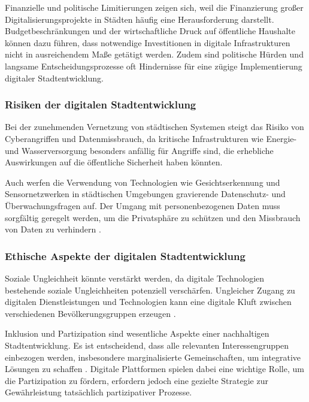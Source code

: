 \documentclass[conference,compsoc,final,a4paper, onecolumn, 11pt]{IEEEtran}
\begin{document}
Finanzielle und politische Limitierungen zeigen sich, weil die Finanzierung großer Digitalisierungsprojekte in Städten häufig eine Herausforderung darstellt. 
Budgetbeschränkungen und der wirtschaftliche Druck auf öffentliche Haushalte können dazu führen, dass notwendige Investitionen in digitale Infrastrukturen nicht in ausreichendem Maße getätigt werden. \autocite{hamilton_funding_2017} 
Zudem sind politische Hürden und langsame Entscheidungsprozesse oft Hindernisse für eine zügige Implementierung digitaler Stadtentwicklung.

\subsubsection{Risiken der digitalen Stadtentwicklung}
Bei der zunehmenden Vernetzung von städtischen Systemen steigt das Risiko von Cyberangriffen und Datenmissbrauch, da kritische Infrastrukturen wie Energie- und Wasserversorgung besonders anfällig für Angriffe sind, die erhebliche Auswirkungen auf die öffentliche Sicherheit haben könnten. \autocite{anwar_smart_2022}

Auch werfen die Verwendung von Technologien wie Gesichtserkennung und Sensornetzwerken in städtischen Umgebungen gravierende Datenschutz- und Überwachungsfragen auf. 
Der Umgang mit personenbezogenen Daten muss sorgfältig geregelt werden, um die Privatsphäre zu schützen und den Missbrauch von Daten zu verhindern \autocite{hongladarom_shoshana_2023}.

\subsubsection{Ethische Aspekte der digitalen Stadtentwicklung}
Soziale Ungleichheit könnte verstärkt werden, da digitale Technologien bestehende soziale Ungleichheiten potenziell verschärfen. 
Ungleicher Zugang zu digitalen Dienstleistungen und Technologien kann eine digitale Kluft zwischen verschiedenen Bevölkerungsgruppen erzeugen \autocite{helsper_corresponding_2012}.

Inklusion und Partizipation sind wesentliche Aspekte einer nachhaltigen Stadtentwicklung. 
Es ist entscheidend, dass alle relevanten Interessengruppen einbezogen werden, insbesondere marginalisierte Gemeinschaften, um integrative Lösungen zu schaffen \autocite{arnstein_ladder_1969}. 
Digitale Plattformen spielen dabei eine wichtige Rolle, um die Partizipation zu fördern, erfordern jedoch eine gezielte Strategie zur Gewährleistung tatsächlich partizipativer Prozesse.
\end{document}
